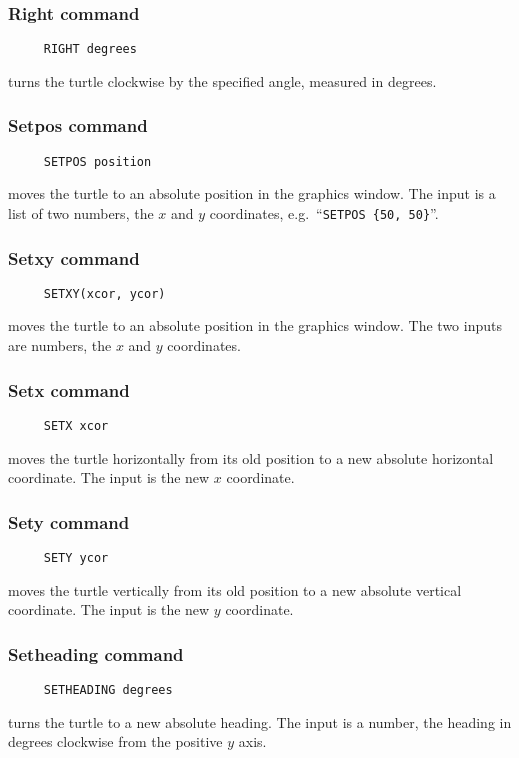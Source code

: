 \subsubsection*{Right command}
\begin{verbatim}
     RIGHT degrees
\end{verbatim}
turns the turtle clockwise by the specified angle, measured in
degrees.

\subsubsection*{Setpos command}
\begin{verbatim}
     SETPOS position
\end{verbatim}
\label{logoturtle:setpos}
moves the turtle to an absolute position in the graphics window.  The
input is a list of two numbers, the $x$ and $y$ coordinates,
e.g.\ ``\texttt{SETPOS \{50, 50\}}''.

\subsubsection*{Setxy command}
\begin{verbatim}
     SETXY(xcor, ycor)
\end{verbatim}
moves the turtle to an absolute position in the graphics window.  The
two inputs are numbers, the $x$ and $y$ coordinates.

\subsubsection*{Setx command}
\begin{verbatim}
     SETX xcor
\end{verbatim}
moves the turtle horizontally from its old position to a new absolute
horizontal coordinate.  The input is the new $x$ coordinate.

\subsubsection*{Sety command}
\begin{verbatim}
     SETY ycor
\end{verbatim}
moves the turtle vertically from its old position to a new absolute
vertical coordinate.  The input is the new $y$ coordinate.

\subsubsection*{Setheading command}
\begin{verbatim}
     SETHEADING degrees
\end{verbatim}
\label{logoturtle:setheading}
turns the turtle to a new absolute heading.  The input is a number,
the heading in degrees clockwise from the positive $y$ axis.

